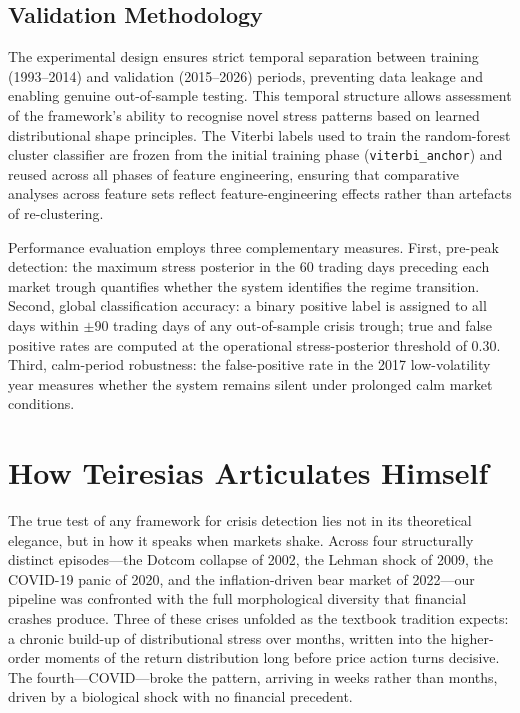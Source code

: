 \documentclass[11pt]{article}
\begin{document}
\subsection{Validation Methodology}
\label{sec:validation}

The experimental design ensures strict temporal separation between
training (1993--2014) and validation (2015--2026) periods, preventing
data leakage and enabling genuine out-of-sample testing. This temporal
structure allows assessment of the framework's ability to recognise
novel stress patterns based on learned distributional shape principles.
The Viterbi labels used to train the random-forest cluster classifier
are frozen from the initial training phase (\texttt{viterbi\_anchor})
and reused across all phases of feature engineering, ensuring that
comparative analyses across feature sets reflect feature-engineering
effects rather than artefacts of re-clustering.

Performance evaluation employs three complementary measures. First,
pre-peak detection: the maximum stress posterior in the 60 trading days
preceding each market trough quantifies whether the system identifies
the regime transition. Second, global classification accuracy: a binary
positive label is assigned to all days within $\pm 90$ trading days of
any out-of-sample crisis trough; true and false positive rates are
computed at the operational stress-posterior threshold of 0.30. Third,
calm-period robustness: the false-positive rate in the 2017
low-volatility year measures whether the system remains silent under
prolonged calm market conditions.

\section{How Teiresias Articulates Himself}
\label{sec:performance}

The true test of any framework for crisis detection lies not in its
theoretical elegance, but in how it speaks when markets shake. Across
four structurally distinct episodes---the Dotcom collapse of 2002, the
Lehman shock of 2009, the COVID-19 panic of 2020, and the
inflation-driven bear market of 2022---our pipeline was confronted with
the full morphological diversity that financial crashes produce. Three
of these crises unfolded as the textbook tradition expects: a chronic
build-up of distributional stress over months, written into the
higher-order moments of the return distribution long before price action
turns decisive. The fourth---COVID---broke the pattern, arriving in
weeks rather than months, driven by a biological shock with no financial
precedent.
\end{document}
